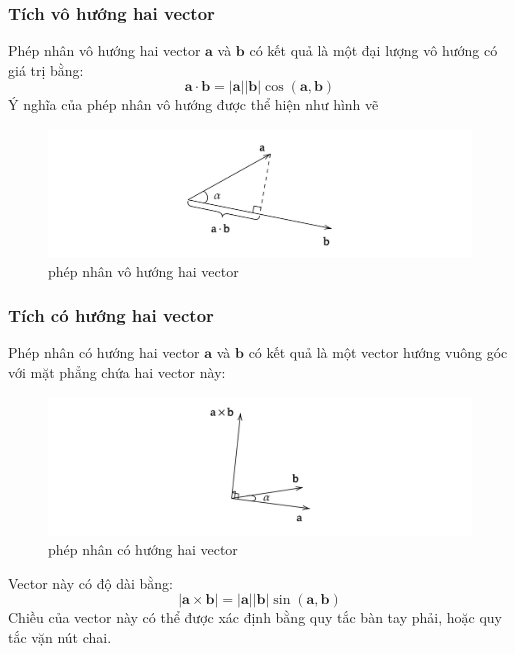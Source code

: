 \subsubsection{Tích vô hướng hai vector}
Phép nhân vô hướng hai vector \(\mathbf{a}\) và \(\mathbf{b}\) có kết quả là một đại lượng vô hướng có giá trị bằng:
\begin{equation}
    \mathbf{a} \cdot \mathbf{b} = |\mathbf{a}| |\mathbf{b}| \cos (\mathbf{a}, \mathbf{b})
\end{equation}
Ý nghĩa của phép nhân vô hướng được thể hiện như hình vẽ
\begin{figure}[H]
    \centering
    \includegraphics[width=1\textwidth]{Tuan2/Figures/tichcham.png}
    \caption{phép nhân vô hướng hai vector}
\end{figure}
\subsubsection{Tích có hướng hai vector}
Phép nhân có hướng hai vector \(\mathbf{a}\) và \(\mathbf{b}\) có kết quả là một vector hướng vuông góc với mặt phẳng chứa hai vector này:
\begin{figure}[H]
    \centering
    \includegraphics[width=1\textwidth]{Tuan2/Figures/tichcheo.png}
    \caption{phép nhân có hướng hai vector}
\end{figure}
Vector này có độ dài bằng:
\begin{equation}
    |\mathbf{a} \times \mathbf{b}| = |\mathbf{a}| |\mathbf{b}| \sin (\mathbf{a}, \mathbf{b})
\end{equation}
Chiều của vector này có thể được xác định bằng quy tắc bàn tay phải, hoặc quy tắc vặn nút chai.

